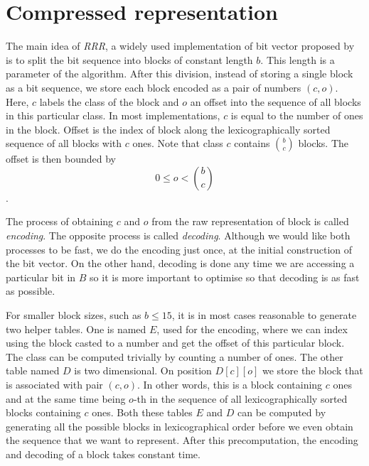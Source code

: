 \section{Compressed representation}
\label{section:compressed_bv}

The main idea of \textit{RRR}, a widely used implementation of bit vector proposed by
\cite{raman2007succinct} is to split the bit sequence into blocks of constant length
$b$. This length is a parameter of the algorithm. After this division, instead
of storing a single block as a bit sequence, we store each block encoded as a pair
of numbers $(c, o)$. Here, $c$ labels the class of the block and $o$ an offset into
the sequence of all blocks in this particular class. In most implementations,
$c$ is equal to the number of ones in the block. Offset is the index of block along
the lexicographically sorted sequence of all blocks with $c$ ones. Note that class
$c$ contains ${b\choose c}$ blocks. The offset is then bounded by $$0 \leq o < {b\choose c}$$.

The process of obtaining $c$ and $o$ from the raw representation of block is called
\textit{encoding}. The opposite process is called \textit{decoding}. Although we would
like both processes to be fast, we do the encoding just once, at the initial construction
of the bit vector. On the other hand, decoding is done any time we are accessing a particular
bit in $B$ so it is more important to optimise so that decoding is as fast as possible.

For smaller block sizes, such as $b\leq 15$, it is in most cases reasonable to
generate two helper tables. One is named $E$, used for the encoding, where we can
index using the block casted to a number and get the offset of this particular block.
The class can be computed trivially by counting a number of ones. The other table
named $D$ is two dimensional. On position $D[c][o]$ we store the block that
is associated with pair $(c, o)$. In other words, this is a block containing $c$ ones
and at the same time being $o$-th in the sequence of all lexicographically sorted
blocks containing $c$ ones. Both these tables $E$ and $D$ can be computed
by generating all the possible blocks in lexicographical order before we even
obtain the sequence that we want to represent. After this precomputation,
the encoding and decoding of a block takes constant time.

